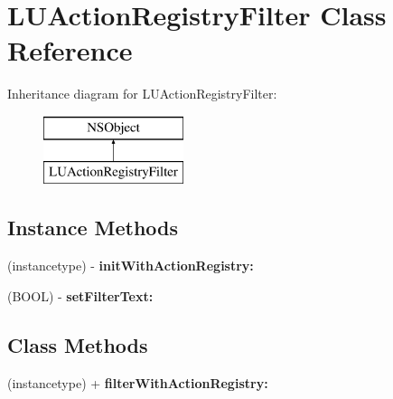 \hypertarget{interface_l_u_action_registry_filter}{}\section{L\+U\+Action\+Registry\+Filter Class Reference}
\label{interface_l_u_action_registry_filter}
Inheritance diagram for L\+U\+Action\+Registry\+Filter\+:\begin{figure}[H]
\begin{center}
\leavevmode
\includegraphics[height=2.000000cm]{interface_l_u_action_registry_filter}
\end{center}
\end{figure}
\subsection*{Instance Methods}
\begin{DoxyCompactItemize}
\item 
\mbox{\label{interface_l_u_action_registry_filter_ad8229465c4c9aae51fe9dbecb90291d7}} 
(instancetype) -\/ {\bfseries init\+With\+Action\+Registry\+:}
\item 
\mbox{\label{interface_l_u_action_registry_filter_a7970837182938b98f6c514e6e74b422e}} 
(B\+O\+OL) -\/ {\bfseries set\+Filter\+Text\+:}
\end{DoxyCompactItemize}
\subsection*{Class Methods}
\begin{DoxyCompactItemize}
\item 
\mbox{\label{interface_l_u_action_registry_filter_a88e6708bdb8858c588a8caeb3128f97d}} 
(instancetype) + {\bfseries filter\+With\+Action\+Registry\+:}
\end{DoxyCompactItemize}
